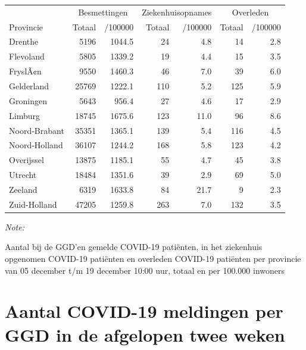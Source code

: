\documentclass[
  english,
  man,floatsintext]{apa6}
\begin{document}
\begin{table}
\centering
\begin{threeparttable}
\begin{tabular}{lrrrrrr}
\toprule
\multicolumn{1}{c}{ } & \multicolumn{2}{c}{Besmettingen} & \multicolumn{2}{c}{Ziekenhuisopnames} & \multicolumn{2}{c}{Overleden} \\
\cmidrule(l{3pt}r{3pt}){2-3} \cmidrule(l{3pt}r{3pt}){4-5} \cmidrule(l{3pt}r{3pt}){6-7}
Provincie & Totaal & /100000 & Totaal & /100000 & Totaal & /100000\\
\midrule
Drenthe & 5196 & 1044.5 & 24 & 4.8 & 14 & 2.8\\
Flevoland & 5805 & 1339.2 & 19 & 4.4 & 15 & 3.5\\
FryslÃ¢n & 9550 & 1460.3 & 46 & 7.0 & 39 & 6.0\\
Gelderland & 25769 & 1222.1 & 110 & 5.2 & 125 & 5.9\\
Groningen & 5643 & 956.4 & 27 & 4.6 & 17 & 2.9\\
Limburg & 18745 & 1675.6 & 123 & 11.0 & 96 & 8.6\\
Noord-Brabant & 35351 & 1365.1 & 139 & 5.4 & 116 & 4.5\\
Noord-Holland & 36107 & 1244.2 & 168 & 5.8 & 123 & 4.2\\
Overijssel & 13875 & 1185.1 & 55 & 4.7 & 45 & 3.8\\
Utrecht & 18484 & 1351.6 & 39 & 2.9 & 69 & 5.0\\
Zeeland & 6319 & 1633.8 & 84 & 21.7 & 9 & 2.3\\
Zuid-Holland & 47205 & 1259.8 & 263 & 7.0 & 132 & 3.5\\
\bottomrule
\end{tabular}
\begin{tablenotes}
\item \textit{Note: } 
\item Aantal bij de GGD’en gemelde COVID-19 patiënten, in het ziekenhuis opgenomen COVID-19 patiënten en overleden COVID-19 patiënten per provincie van 05 december t/m 19 december 10:00 uur, totaal en per 100.000 inwoners
\end{tablenotes}
\end{threeparttable}
\end{table}

\newpage

\hypertarget{aantal-covid-19-meldingen-per-ggd-in-de-afgelopen-twee-weken}{%
\section{Aantal COVID-19 meldingen per GGD in de afgelopen twee weken}\label{aantal-covid-19-meldingen-per-ggd-in-de-afgelopen-twee-weken}}
\end{document}
